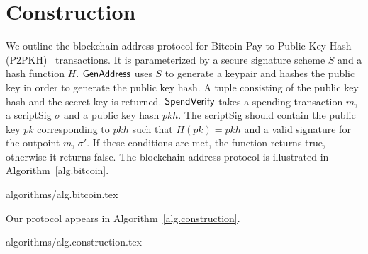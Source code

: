 \section{Construction}\label{section:construction}

We outline the blockchain address protocol for Bitcoin Pay to Public Key Hash (P2PKH)~\cite{bitcoin-dev-guide} transactions. It is parameterized by a secure signature scheme $S$ and a hash function $H$.
$\mathsf{GenAddress}$ uses $S$ to generate a keypair and hashes the public key in order to generate the public key hash. A tuple consisting of the public key hash and the secret key is returned.
$\mathsf{SpendVerify}$ takes a spending transaction $m$, a scriptSig $\sigma$ and a public key hash $pkh$. The scriptSig should contain the public key $pk$ corresponding to $pkh$ such that $H(pk) = pkh$ and a valid signature for the outpoint $m$, $\sigma'$. If these conditions are met, the function returns true, otherwise it returns false.
The blockchain address protocol is illustrated in Algorithm~\ref{alg.bitcoin}.

{algorithms/alg.bitcoin.tex}

Our protocol appears in Algorithm~\ref{alg.construction}.

{algorithms/alg.construction.tex}
